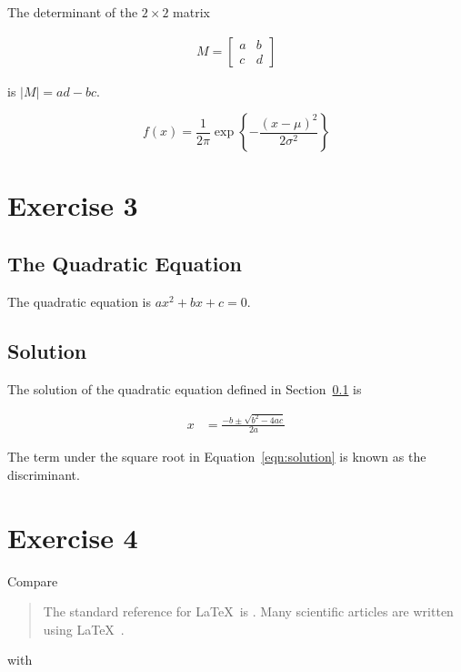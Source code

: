 \documentclass[10pt,a4paper]{article}
\begin{document}
    The determinant of the $2 \times 2$ matrix

    \begin{align}
    M = \left[ \begin{matrix}
    a & b \\
    c & d
    \end{matrix} \right]
    \end{align}

    is $|M| = ad - bc$.

    \[
        f(x) = \frac1{2\pi} \exp\left\{-\frac{(x-\mu)^2}{2\sigma^2}\right\}
    \]

\section*{Exercise 3}
    \setcounter{section}{3}
    \subsection{The Quadratic Equation}
    \label{sec:quadratic}

    The quadratic equation is $ax^2 + bx + c = 0$.

    \subsection{Solution}
    \label{sec:solution}

    The solution of the quadratic equation defined in
    Section~\ref{sec:quadratic} is

    \begin{align}
        x &= \frac{-b \pm \sqrt{b^2 - 4ac}}{2a}
        \label{eqn:solution}
    \end{align}

    The term under the square root in Equation~\ref{eqn:solution} is known as
    the discriminant.

\section*{Exercise 4}

    Compare

    \begin{quote}
        The standard reference for \LaTeX~is \citet{Lamport:1994}. Many
        scientific articles are written using \LaTeX~\citep{Lamport:1994}.
    \end{quote}

    with
\end{document}
